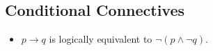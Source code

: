\documentclass[MASTER.tex]{subfiles}
\begin{document}
\subsection{Conditional Connectives}

\begin{itemize}
\item $p \rightarrow q$ is logically equivalent to $\neg(p \wedge \neg q)$.
\end{itemize}
\end{document}
